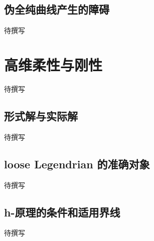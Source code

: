 \subsection{伪全纯曲线产生的障碍}
\label{g4:subsec:D02:03}
待撰写

\section{高维柔性与刚性}
\label{g4:sec:D03}
待撰写

\subsection{形式解与实际解}
\label{g4:subsec:D03:01}
待撰写

\subsection{loose Legendrian 的准确对象}
\label{g4:subsec:D03:02}
待撰写

\subsection{h-原理的条件和适用界线}
\label{g4:subsec:D03:03}
待撰写
